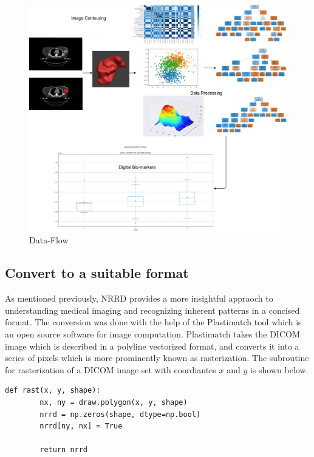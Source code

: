 \documentclass[final,1p,times,twocolumn]{elsarticle}
\begin{document}
\begin{figure}[!b]
\centering
\includegraphics[width=5.4in]{im.png}
\caption{Data-Flow}
\label{img2}
\end{figure}

\subsection{Convert to a suitable format}

As mentioned previously, NRRD provides a more insightful appraoch to understanding medical imaging and recognizing inherent patterns in a concised format. The conversion was done with the help of the Plastimatch tool which is an open source software for image computation. Plastimatch takes the DICOM image which is described in a polyline vectorized format, and converts it into a series of pixels which is more prominently known as rasterization. The subroutine for rasterization of a DICOM image set with coordiantes $x$ and $y$ is shown below.

\begin{verbatim}
def rast(x, y, shape):
        nx, ny = draw.polygon(x, y, shape)
        nrrd = np.zeros(shape, dtype=np.bool)
        nrrd[ny, nx] = True 

        return nrrd
\end{verbatim}

\end{document}
